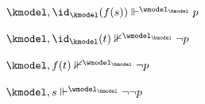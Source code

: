 \begin{example}
\begin{figure}
\begin{center}
{\begin{minipage}[t]{.55\textwidth}
\begin{enumerate}[label=(\alph*),leftmargin=*]
\begin{description}
\begin{description}
\begin{description}
\begin{description}
                          \begin{description}
                            \item[$\kmodel, \id_{\kmodel}(f(s)) \Vdash^{\wmodel_{\bmodel}} p$] 
                          \end{description}
                      \end{description}
                  \end{description}
                \item[$\id_{\kmodel}(s) \R_{\kmodel} t$]\hfil
                  \begin{description}
                    \item[$\kmodel, t \Vdash^{\wmodel_{\bmodel}} \lnot\lnot p$]
                    \item[for all $\F$]
                    {\color{red}
                    \item[$\id_{\kmodel}: \kmodel \to \kmodel$]\hfil
                      \begin{description}
                        \item[$\kmodel, \id_{\kmodel}(t) \nVdash^{\wmodel_{\bmodel}} \lnot p$] 
                      \end{description}
                    \item[$f: \kmodel \to \kmodel$]\hfil
                      \begin{description}
                        \item[$\kmodel, f(t) \nVdash^{\wmodel_{\bmodel}} \lnot p$] 
                      \end{description}
                    }
                  \end{description}
              \end{description}
            \item[$f : \kmodel \to \kmodel$]\hfil
              \begin{description}\setlength{\itemsep}{0pt}
                \item[for all $\Box$]
                \item[$f(s) \R_{\kmodel} s$]\hfil
                  \begin{description}
                    \item[$\kmodel, s \Vdash^{\wmodel_{\bmodel}} \lnot\lnot p$]
                  \end{description}
                \item[$f(s) \R_{\kmodel} t$]\hfil
                  \begin{description}

\end{description}
\end{description}
\end{description}
\end{enumerate}
\end{minipage}}
\end{center}
\end{figure}
\end{example}

